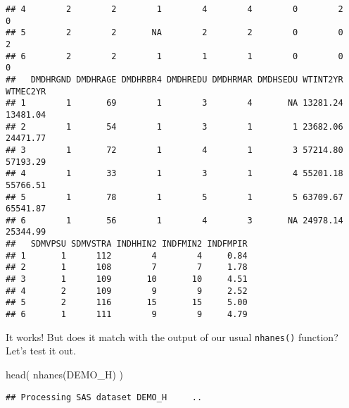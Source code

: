 \documentclass[
]{book}
\newenvironment{Shaded}{\begin{snugshade}}{\end{snugshade}}
\newcommand{\FunctionTok}[1]{\textcolor[rgb]{0.00,0.00,0.00}{#1}}
\newcommand{\NormalTok}[1]{#1}
\newcommand{\StringTok}[1]{\textcolor[rgb]{0.31,0.60,0.02}{#1}}
\begin{document}
\begin{verbatim}
## 4        2        2        1        4        4        0        2        0
## 5        2        2       NA        2        2        0        0        2
## 6        2        2        1        1        1        0        0        0
##   DMDHRGND DMDHRAGE DMDHRBR4 DMDHREDU DMDHRMAR DMDHSEDU WTINT2YR WTMEC2YR
## 1        1       69        1        3        4       NA 13281.24 13481.04
## 2        1       54        1        3        1        1 23682.06 24471.77
## 3        1       72        1        4        1        3 57214.80 57193.29
## 4        1       33        1        3        1        4 55201.18 55766.51
## 5        1       78        1        5        1        5 63709.67 65541.87
## 6        1       56        1        4        3       NA 24978.14 25344.99
##   SDMVPSU SDMVSTRA INDHHIN2 INDFMIN2 INDFMPIR
## 1       1      112        4        4     0.84
## 2       1      108        7        7     1.78
## 3       1      109       10       10     4.51
## 4       2      109        9        9     2.52
## 5       2      116       15       15     5.00
## 6       1      111        9        9     4.79
\end{verbatim}

It works! But does it match with the output of our usual \texttt{nhanes()} function? Let's test it out.

\begin{Shaded}
\begin{Highlighting}[]
\FunctionTok{head}\NormalTok{(}
    \FunctionTok{nhanes}\NormalTok{(}\StringTok{\textquotesingle{}DEMO\_H\textquotesingle{}}\NormalTok{)}
\NormalTok{    )}
\end{Highlighting}
\end{Shaded}

\begin{verbatim}
## Processing SAS dataset DEMO_H     ..
\end{verbatim}
\end{document}
